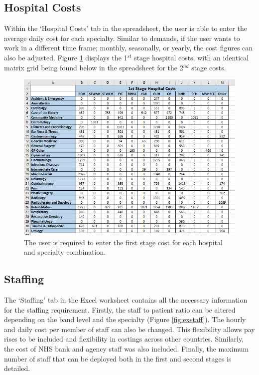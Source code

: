 \documentclass[../thesis.tex]{subfiles}
\begin{document}
\subsection*{Hospital Costs}
Within the `Hospital Costs' tab in the spreadsheet, the user is able to enter the average daily cost for each specialty. Similar to demands, if the user wants to work in a different time frame; monthly, seasonally, or yearly, the cost figures can also be adjusted. Figure \ref{fig:excostings} displays the 1$^{st}$ stage hospital costs, with an identical matrix grid being found below in the spreadsheet for the 2$^{nd}$ stage costs. 
\begin{figure}[h!]
    \centering
    \includegraphics{Chapters/Chapter7/Figures/Costings.png}
    \caption{The user is required to enter the first stage cost for each hospital and specialty combination.}
    \label{fig:excostings}
\end{figure}

\subsection*{Staffing}
The `Staffing' tab in the Excel worksheet contains all the necessary information for the staffing requirement. Firstly, the staff to patient ratio can be altered depending on the band level and the specialty (Figure \ref{fig:exstaff}). The hourly and daily cost per member of staff can also be changed. This flexibility allows pay rises to be included and flexibility in costings across other countries. Similarly, the cost of NHS bank and agency staff was also included. Finally, the maximum number of staff that can be deployed both in the first and second stages is detailed. 
\end{document}
